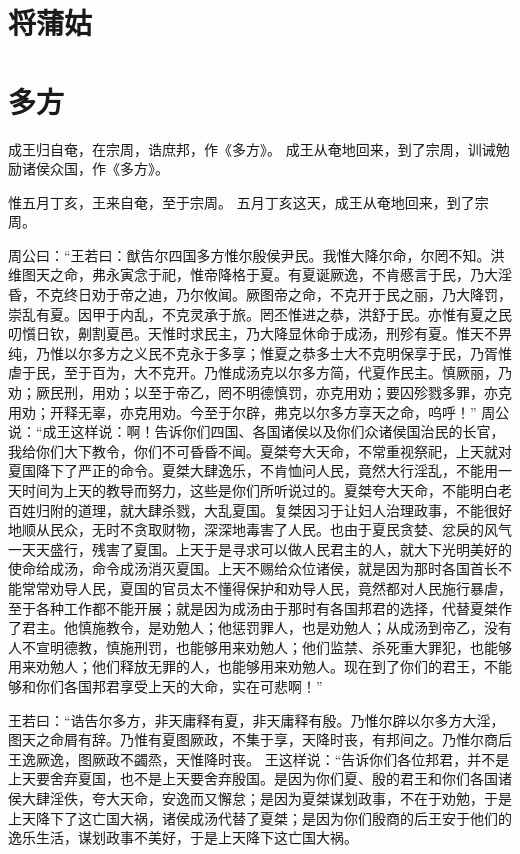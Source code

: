 \documentclass[a4paper,12pt,UTF8,twoside]{ctexbook}
\begin{document}
\chapter{将蒲姑}

\chapter{多方}

成王归自奄，在宗周，诰庶邦，作《多方》。
成王从奄地回来，到了宗周，训诫勉励诸侯众国，作《多方》。

惟五月丁亥，王来自奄，至于宗周。
五月丁亥这天，成王从奄地回来，到了宗周。

周公曰：“王若曰：猷告尔四国多方惟尔殷侯尹民。我惟大降尔命，尔罔不知。洪维图天之命，弗永寅念于祀，惟帝降格于夏。有夏诞厥逸，不肯慼言于民，乃大淫昏，不克终日劝于帝之迪，乃尔攸闻。厥图帝之命，不克开于民之丽，乃大降罚，崇乱有夏。因甲于内乱，不克灵承于旅。罔丕惟进之恭，洪舒于民。亦惟有夏之民叨懫日钦，劓割夏邑。天惟时求民主，乃大降显休命于成汤，刑殄有夏。惟天不畀纯，乃惟以尔多方之义民不克永于多享；惟夏之恭多士大不克明保享于民，乃胥惟虐于民，至于百为，大不克开。乃惟成汤克以尔多方简，代夏作民主。慎厥丽，乃劝；厥民刑，用劝；以至于帝乙，罔不明德慎罚，亦克用劝；要囚殄戮多罪，亦克用劝；开释无辜，亦克用劝。今至于尔辟，弗克以尔多方享天之命，呜呼！”
周公说：“成王这样说：啊！告诉你们四国、各国诸侯以及你们众诸侯国治民的长官，我给你们大下教令，你们不可昏昏不闻。夏桀夸大天命，不常重视祭祀，上天就对夏国降下了严正的命令。夏桀大肆逸乐，不肯恤问人民，竟然大行淫乱，不能用一天时间为上天的教导而努力，这些是你们所听说过的。夏桀夸大天命，不能明白老百姓归附的道理，就大肆杀戮，大乱夏国。复桀因习于让妇人治理政事，不能很好地顺从民众，无时不贪取财物，深深地毒害了人民。也由于夏民贪婪、忿戾的风气一天天盛行，残害了夏国。上天于是寻求可以做人民君主的人，就大下光明美好的使命给成汤，命令成汤消灭夏国。上天不赐给众位诸侯，就是因为那时各国首长不能常常劝导人民，夏国的官员太不懂得保护和劝导人民，竟然都对人民施行暴虐，至于各种工作都不能开展；就是因为成汤由于那时有各国邦君的选择，代替夏桀作了君主。他慎施教令，是劝勉人；他惩罚罪人，也是劝勉人；从成汤到帝乙，没有人不宣明德教，慎施刑罚，也能够用来劝勉人；他们监禁、杀死重大罪犯，也能够用来劝勉人；他们释放无罪的人，也能够用来劝勉人。现在到了你们的君王，不能够和你们各国邦君享受上天的大命，实在可悲啊！”

王若曰：“诰告尔多方，非天庸释有夏，非天庸释有殷。乃惟尔辟以尔多方大淫，图天之命屑有辞。乃惟有夏图厥政，不集于享，天降时丧，有邦间之。乃惟尔商后王逸厥逸，图厥政不蠲烝，天惟降时丧。
王这样说：“告诉你们各位邦君，并不是上天要舍弃夏国，也不是上天要舍弃殷国。是因为你们夏、殷的君王和你们各国诸侯大肆淫佚，夸大天命，安逸而又懈怠；是因为夏桀谋划政事，不在于劝勉，于是上天降下了这亡国大祸，诸侯成汤代替了夏桀；是因为你们殷商的后王安于他们的逸乐生活，谋划政事不美好，于是上天降下这亡国大祸。
\end{document}
